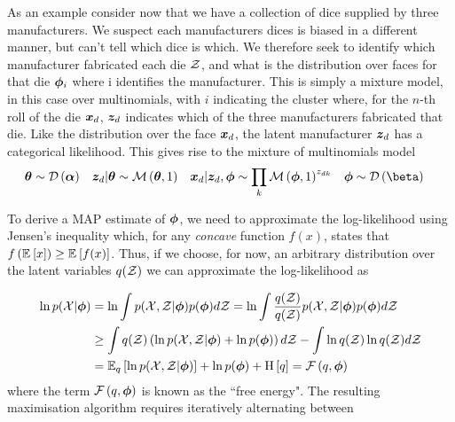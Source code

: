 As an example consider now that we have a collection of dice supplied by three manufacturers. We suspect each manufacturers dices is biased in a different manner, but can't tell which dice is which. We therefore seek to identify which manufacturer fabricated each die ${ \mathcal{Z} }$, and what is the distribution over faces for that die ${ \bm \phi }_i$ where i identifies the manufacturer. This is simply a mixture model, in this case over multinomials, with $i$ indicating the cluster where, for the $n$-th roll of the die $\bm x_d$, $\bm z_d$ indicates which of the three manufacturers fabricated that die. Like the distribution over the face $\bm x_d$, the latent manufacturer $\bm z_d$ has a categorical likelihood. This gives rise to the mixture of multinomials model\cite{Nigam2000}
\begin{align*}
\vv{\theta} & \sim \dir{\vv{\alpha}} &
\vv{z}_d|\vv{\theta} & \sim \muln{\vv{\theta}}{1} & 
\vv{x}_d|\vv{z}_d, \param & \sim \prod_k \muln{\param}{1}^{z_{dk}} & 
\param & \sim \dir{\vv{\beta}}
\end{align*}

To derive a MAP estimate of ${ \bm \phi }$, we need to approximate the log-likelihood using Jensen's inequality which, for any \emph{concave} function $f(x)$, states that $f\left(\mathbb{E}_{ {  } }\left[ x \right]\right) \geq \mathbb{E}_{ {  } }\left[ f(x) \right]$. Thus, if we choose, for now, an arbitrary distribution over the latent variables $q({ \mathcal{Z} })$ we can approximate the log-likelihood as

\begin{align*}
\ln p({ \mathcal{X} }|{ \bm \phi }) & = \ln \int { p( { \mathcal{X} } ,  { \mathcal{Z} } |  {  \bm \phi  } ) } p({ \bm \phi }) d{ \mathcal{Z} } 
 = \ln \int \frac{q({ \mathcal{Z} })}{q({ \mathcal{Z} })} { p({ \mathcal{X} }, { \mathcal{Z} } | { \bm \phi }) } p({ \bm \phi }) d{ \mathcal{Z} } \\
& \geq \int  q({ \mathcal{Z} }) \left({ \ln { p( { \mathcal{X} } ,  { \mathcal{Z} } |  {  \bm \phi  } ) } } + \ln p({ \bm \phi })\right) d{ \mathcal{Z} }
  -     \int \ln q({ \mathcal{Z} }) \ln q({ \mathcal{Z} }) d{ \mathcal{Z} } \\
& = { \mathbb{E}_{ { {q} } }\left[ { \ln { p( { \mathcal{X} } ,  { \mathcal{Z} } |  {  \bm \phi  } ) } } \right] } + \ln p({ \bm \phi }) + \text{H} \left[ q \right] = { \mathcal{F}\left( {q, { \bm \phi }} \right) }
\end{align*}
where the term ${ \mathcal{F}\left( {q, { \bm \phi }} \right) }$ is known as the ``free energy". The resulting maximisation algorithm requires iteratively alternating between

